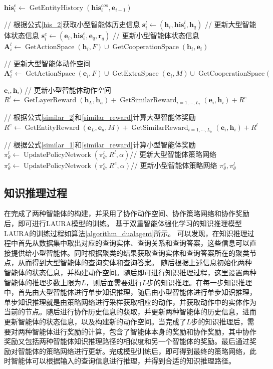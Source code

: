 \documentclass[algorithmlist, AutoFakeBold, AutoFakeSlant, figurelist, tablelist, nomlist, engineering]{seuthesix}
\begin{document}
\begin{algorithm}[H]
\begin{algorithmic}[1]
  \State $\bm{his}_{i}^{e} \leftarrow \operatorname{GetEntityHistory}(\bm{his}_{i}^{coo}, \bm{e}_{i-1})$ \par\quad\quad // 根据公式\ref{his_2}获取小型智能体历史信息
  \State $\bm{s}_{i}^{l} \leftarrow (\bm{h}_{i}, \bm{his}_{i}^{l}, \bm{h}_q)$ // 更新大型智能体状态信息
  \State $\bm{s}_{i}^{e} \leftarrow (\bm{e}_{i}, \bm{his}_{i}^{e}, \bm{e}_q, \bm{r}_q)$ // 更新小型智能体状态信息
  \State $\bm{A}_{i}^{l} \leftarrow \operatorname{GetActionSpace}(\bm{h}_i, F) \cup \operatorname{GetCooperationSpace}(\bm{h}_i, \bm{e}_i)$ \par\quad\quad// 更新大型智能体动作空间
  \State $\bm{A}_{i}^{e} \leftarrow \operatorname{GetActionSpace}(\bm{e}_i, F) \cup \operatorname{GetExtraSpace}(\bm{e}_i, M) \cup \operatorname{GetCooperationSpace}($\par\quad\quad$\bm{e}_i, \bm{h}_i)$ // 更新小型智能体动作空间
  \EndFor
  \State $R^{l} \leftarrow \operatorname{GetLayerReward}(\bm{h}_L, \bm{h}_a) + \operatorname{GetSimilarReward}_{i=1,\cdots,L_l}(\bm{e}_i, \bm{h}_i) + R^{e}$ \par\quad // 根据公式\ref{similar_2}和\ref{similar_reward}计算大型智能体奖励
  \State $R^{e} \leftarrow \operatorname{GetEntityReward}(\bm{e}_L, \bm{e}_a, M) + \operatorname{GetSimilarReward}_{i=1,\cdots,L_e}(\bm{e}_i, \bm{h}_i) + R^{l}$ \par\quad // 根据公式\ref{similar_1}和\ref{similar_reward}计算小型智能体奖励
  \State $\pi_\theta^l \leftarrow \operatorname{UpdatePolicyNetwork}(\pi_\theta^l, R^{l}, \alpha)$// 更新大型智能体策略网络
  \State $\pi_\theta^e \leftarrow \operatorname{UpdatePolicyNetwork}(\pi_\theta^e, R^{e}, \alpha)$// 更新小型智能体策略网络
  \EndFor
  \State \Return $\pi_\theta^e, \pi_\theta^l$
	\end{algorithmic}
\end{algorithm} 

\subsection{知识推理过程}
在完成了两种智能体的构建，并采用了协作动作空间、协作策略网络和协作奖励后，即可进行LAURA模型的训练。
基于双重智能体强化学习的知识推理模型LAURA的训练过程如算法\ref{algorithm_dualagent}所示。
可以发现，在知识推理过程中首先从数据集中取出对应的查询实体、查询关系和查询答案，这些信息可以直接提供给小型智能体。同时根据聚类的结果获取查询实体和查询答案所在的聚类节点，从而得到大型智能体的查询实体和查询答案。
随后根据上述信息初始化两种智能体的状态信息，并构建动作空间。随后即可进行知识推理过程，这里设置两种智能体的推理步数上限为$L$，则后面需要进行$L$步的知识推理。在每一步知识推理中，首先由大型智能体进行单步知识推理，随后由小型智能体进行单步知识推理，单步知识推理就是由策略网络进行采样获取相应的动作，并获取动作中的实体作为当前的节点。随后进行协作历史信息的获取，并更新两种智能体的历史信息，进而更新智能体的状态信息，以及构建新的动作空间。当完成了$L$步的知识推理后，需要对两种智能体进行奖励的计算，包含了智能体本身的奖励和协作奖励，其中协作奖励又包括两种智能体知识推理路径的相似度和另一个智能体的奖励。最后通过奖励对智能体的策略网络进行更新。完成模型训练后，即可得到最终的策略网络，此时智能体可以根据输入的查询信息进行推理，并得到合适的知识推理路径。
\end{document}
